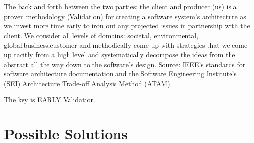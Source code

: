 \documentclass{article}
\begin{document}
The back and forth between the two parties; the client and producer (us) is a proven methodology (Validation) for creating a software system's architecture as we invest more time early to iron out any projected issues in partnership with the client. We consider all levels of domains: societal, environmental, global,business,customer and methodically come up with strategies that we come up tacitly from a high level and systematically decompose the ideas from the abstract all the way down to the software's design. Source: IEEE's standards for software architecture documentation and the Software Engineering Institute's (SEI) Architecture Trade-off Analysis Method (ATAM).

The key is EARLY Validation.


\section{Possible Solutions}
\end{document}
